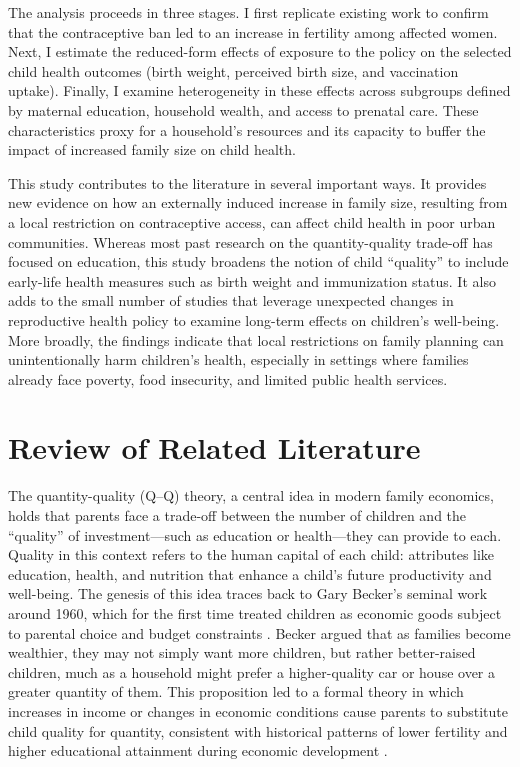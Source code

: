 \documentclass[]{AEA}
\begin{document}
The analysis proceeds in three stages. I first replicate existing work
\citep{dumas2019sex} to confirm that the contraceptive ban led to an
increase in fertility among affected women. Next, I estimate the
reduced-form effects of exposure to the policy on the selected child
health outcomes (birth weight, perceived birth size, and vaccination
uptake). Finally, I examine heterogeneity in these effects across
subgroups defined by maternal education, household wealth, and access to
prenatal care. These characteristics proxy for a household's resources
and its capacity to buffer the impact of increased family size on child
health.

This study contributes to the literature in several important ways. It
provides new evidence on how an externally induced increase in family
size, resulting from a local restriction on contraceptive access, can
affect child health in poor urban communities. Whereas most past
research on the quantity-quality trade-off has focused on education,
this study broadens the notion of child ``quality'' to include
early-life health measures such as birth weight and immunization status.
It also adds to the small number of studies that leverage unexpected
changes in reproductive health policy to examine long-term effects on
children's well-being. More broadly, the findings indicate that local
restrictions on family planning can unintentionally harm children's
health, especially in settings where families already face poverty, food
insecurity, and limited public health services.

\section{Review of Related Literature}

The quantity-quality (Q--Q) theory, a central idea in modern family
economics, holds that parents face a trade-off between the number of
children and the ``quality'' of investment---such as education or
health---they can provide to each. Quality in this context refers to the
human capital of each child: attributes like education, health, and
nutrition that enhance a child's future productivity and well-being. The
genesis of this idea traces back to Gary Becker's seminal work around
1960, which for the first time treated children as economic goods
subject to parental choice and budget constraints
\citep{becker1960economic}. Becker argued that as families become
wealthier, they may not simply want more children, but rather
better-raised children, much as a household might prefer a
higher-quality car or house over a greater quantity of them. This
proposition led to a formal theory in which increases in income or
changes in economic conditions cause parents to substitute child quality
for quantity, consistent with historical patterns of lower fertility and
higher educational attainment during economic development
\citep{galor2000population}.
\end{document}
